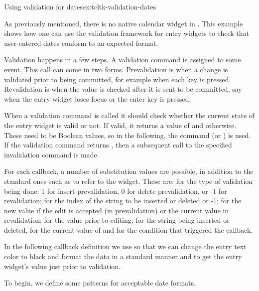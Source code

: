 \begin{example}{Using validation for dates}{ex:tcltk-validation-dates}



As previously mentioned, there is no native calendar widget in . This example shows how one can use the validation framework for entry widgets to check that user-entered dates conform to an expected format. 

Validation happens in a few steps.  A validation command is assigned
to some event. This call can come in two forms. Prevalidation is when
a change is validated prior to being committed, for example when each key
is pressed.  Revalidation is when the value is checked
after it is sent to be committed, say when the entry widget loses
focus or the enter key is pressed.

When a validation command is called it should check
whether the current state of the entry widget is valid or not. If
valid, it returns a value of  and 
otherwise. These need to be \TCL\/ Boolean values, so in the following,
the command  (or ) is used. If
the validation command returns , then a subsequent call to
the specified invalidation command is made.

For each callback, a number of substitution values are possible, in
addition to the standard ones such as  to refer to the
widget. These are:  for the type of validation being done: 1
for insert prevalidation, 0 for delete prevalidation, or -1 for
revalidation;  for the index of the string to be inserted or
deleted or -1;  for the new value if the edit is accepted (in
prevalidation) or the current value in revalidation;  for the
value prior to editing;  for the string being inserted or
deleted,  for the current value of  and
 for the condition that triggered the callback.

In the following callback definition we use  so that we can change the entry text color to black and format the data in a standard manner and  to get the entry widget's value just prior to validation.


To begin,  we define some patterns for acceptable date formats.
\begin{Schunk}
\end{Schunk}


\end{example}
